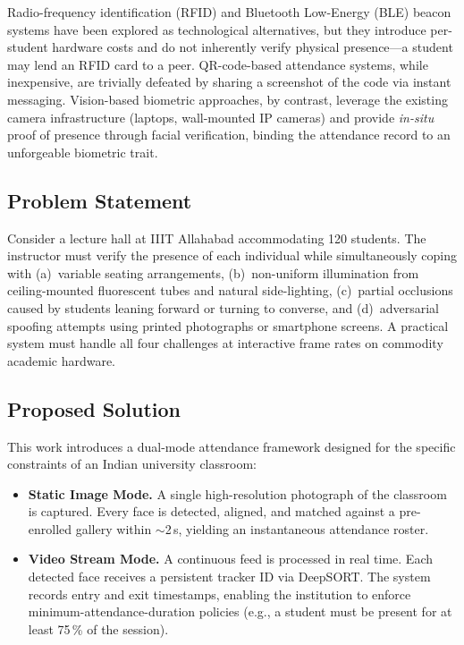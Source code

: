 \documentclass[conference, 10pt]{IEEEtran}
\begin{document}
Radio-frequency identification (RFID) and Bluetooth Low-Energy (BLE) beacon systems have been
explored as technological alternatives, but they introduce per-student hardware costs and do not
inherently verify physical presence---a student may lend an RFID card to a peer.  QR-code-based
attendance systems, while inexpensive, are trivially defeated by sharing a screenshot of the
code via instant messaging.  Vision-based biometric approaches, by contrast, leverage the
existing camera infrastructure (laptops, wall-mounted IP cameras) and provide \emph{in-situ}
proof of presence through facial verification, binding the attendance record to an
unforgeable biometric trait.

\subsection{Problem Statement}

Consider a lecture hall at IIIT Allahabad accommodating 120 students.  The instructor must
verify the presence of each individual while simultaneously coping with (a)~variable seating
arrangements, (b)~non-uniform illumination from ceiling-mounted fluorescent tubes and natural
side-lighting, (c)~partial occlusions caused by students leaning forward or turning to
converse, and (d)~adversarial spoofing attempts using printed photographs or smartphone
screens.  A practical system must handle all four challenges at interactive frame rates on
commodity academic hardware.

\subsection{Proposed Solution}

This work introduces a dual-mode attendance framework designed for the specific constraints of
an Indian university classroom:

\begin{itemize}
    \item \textbf{Static Image Mode.}  A single high-resolution photograph of the classroom is
          captured.  Every face is detected, aligned, and matched against a pre-enrolled gallery
          within $\sim$2\,s, yielding an instantaneous attendance roster.
    \item \textbf{Video Stream Mode.}  A continuous feed is processed in real time.  Each
          detected face receives a persistent tracker ID via DeepSORT.  The system records entry
          and exit timestamps, enabling the institution to enforce minimum-attendance-duration
          policies (e.g., a student must be present for at least 75\,\% of the session).
\end{itemize}
\end{document}
